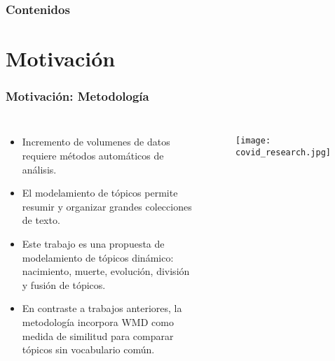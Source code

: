 \documentclass[
	spanish, %
	aspectratio=43, %
	hyperref={pdfencoding=auto,psdextra},
	xcolor={dvipsnames,table,usenames},
]{beamer}
\title[\documentsubtitle]{\documenttitle}
\subtitle{\documentsubject}
\author[\documentauthor]{
	\documentauthor \newline\newline
Profesor guía: Richard Weber \newline
Miembros de la comisión: Ángel Jiménez, Giorgiogiulio Parra
}
\institute[UChile]{
	\texttt{[image: \\universitydepartmentimage]} \\
	\medskip
	\universityname \\
	\universityfaculty \\
	\universitydepartment
}
\date[\today]{\footnotesize{\today}}
\begin{document}
\templatePagecfg

\templateFinalcfg

\newcommand\blfootnote[1]{%
  \begingroup
  \renewcommand\thefootnote{}\footnote{#1}%
  \addtocounter{footnote}{-1}%
  \endgroup
}

\begin{frame}
	\titlepage
\end{frame}


\begin{frame}
	\frametitle{Contenidos}
	\tableofcontents
\end{frame}


\section{Motivación}

\begin{frame}[t]
\frametitle{Motivación: Metodología}
  
\begin{columns}
\begin{itemize}
  \item Incremento de volumenes de datos requiere métodos automáticos de análisis.
  \item El modelamiento de tópicos permite resumir y organizar grandes colecciones de texto. %
  \item Este trabajo es una propuesta de modelamiento de tópicos dinámico: nacimiento, muerte, evolución, división y fusión de tópicos.
  \item En contraste a trabajos anteriores, la metodología incorpora WMD como medida de similitud para comparar tópicos sin vocabulario común.
\end{itemize}


\begin{figure}
  \texttt{[image: covid\_research.jpg]} 
 \end{figure}
 \end{columns}
\end{frame}
\end{document}
